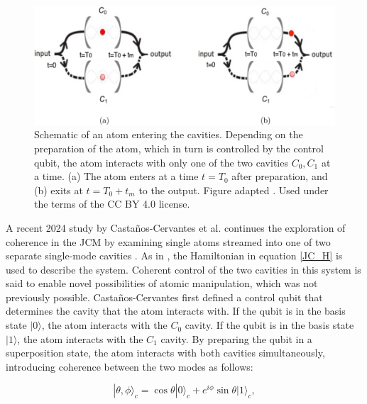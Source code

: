 \documentclass[12pt,a4paper]{article}
\begin{document}
\begin{figure}[h]
    \centering
    \includegraphics[scale=0.3754]{coh_ent_2x_cavity}
    \caption{Schematic of an atom entering the cavities. Depending on the preparation of the atom, which in turn is controlled by the control qubit, the atom interacts with only one of the two cavities $C_0, C_1$ at a time. (a) The atom enters at a time $t = T_0$ after preparation, and (b) exits at $t = T_0 + t_m$ to the output. Figure adapted \cite{CohEnt2024-2_JCM_coherence}. Used under the terms of the CC BY 4.0 license.}
    \label{fig:double_cavity}
\end{figure}

A recent 2024 study by Castaños-Cervantes et al. continues the exploration of coherence in the JCM by examining single atoms streamed into one of two separate single-mode cavities  \cite{CohEnt2024-2_JCM_coherence}. As in \cite{CohEnt2020-Cavity_controlled_coherence}, the Hamiltonian in equation \eqref{JC_H} is used to describe the system. Coherent control of the two cavities in this system is said to enable novel possibilities of atomic manipulation, which was not previously possible. Castaños-Cervantes first defined a control qubit that determines the cavity that the atom interacts with. If the qubit is in the basis state $|0\rangle$, the atom interacts with the $C_0$ cavity. If the qubit is in the basis state $|1\rangle$, the atom interacts with the $C_1$ cavity. By preparing the qubit in a superposition state, the atom interacts with both cavities simultaneously, introducing coherence between the two modes as follows:

\begin{equation}
    |\theta,\phi\rangle_c = \cos{\theta}|0\rangle_c + e^{i\phi}\sin{\theta}|1\rangle_c,
\end{equation}
\end{document}
